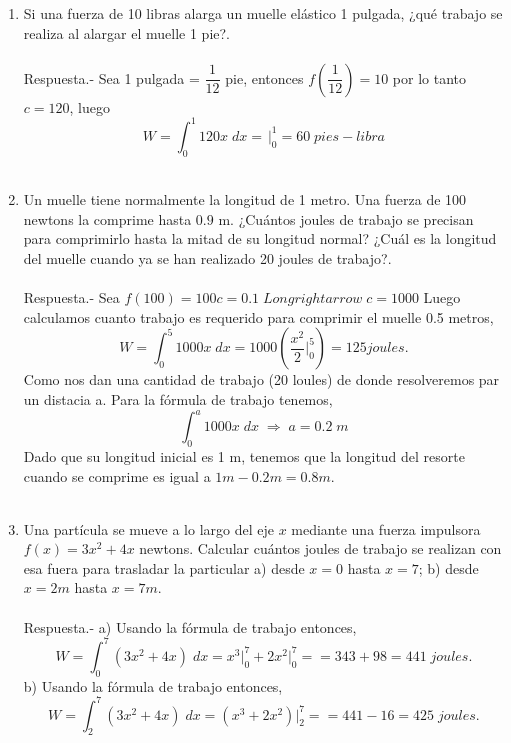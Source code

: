 \begin{enumerate}[ \bfseries 1.]

    \item Si una fuerza de 10 libras alarga un muelle elástico 1 pulgada, ¿qué trabajo se realiza al alargar el muelle 1 pie?.\\\\
	Respuesta.-\; Sea 1 pulgada = $\dfrac{1}{12}$ pie, entonces $f\left(\dfrac{1}{12}\right) = 10$ por lo tanto $c=120$, luego 
	$$W=\int_0^1 120x\; dx = \dfrac{}{}\bigg|_0^1 = 60\; pies-libra$$\\

    \item Un muelle tiene normalmente la longitud de 1 metro. Una fuerza de 100 newtons la comprime hasta $0.9$ m. ¿Cuántos joules de trabajo se precisan para comprimirlo hasta la mitad de su longitud normal? ¿Cuál es la longitud del muelle cuando ya se han realizado 20 joules de trabajo?.\\\\
	Respuesta.-\; Sea $f(100) = 100c = 0.1\; Longrightarrow \; c=1000$
	Luego calculamos cuanto trabajo es requerido para comprimir el muelle 0.5 metros,
	$$W = \int_0^5 1000x\; dx = 1000\left(\dfrac{x^2}{2}\bigg|_0^5\right) = 125 joules.$$
	Como nos dan una cantidad de trabajo (20 loules) de donde resolveremos par un distacia a. Para la fórmula de trabajo tenemos,
	$$\int_0^a 1000x\; dx \; \Longrightarrow \; a=0.2\;m$$
	Dado que su longitud inicial es 1 m, tenemos que la longitud del resorte cuando se comprime es igual a $1m-0.2m = 0.8m$.\\\\

    \item Una partícula se mueve a lo largo del eje $x$ mediante una fuerza impulsora $f(x)=3x^2+4x$ newtons. Calcular cuántos joules de trabajo se realizan con esa fuera para trasladar la particular a) desde $x=0$ hasta $x=7$; b) desde $x=2m$ hasta $x=7m$.\\\\
	Respuesta.-\; a) Usando la fórmula de trabajo entonces,
	$$W=\int_0^7 (3x^2+4x)\; dx = x^3\bigg|_0^7 + 2x^2\bigg|_0^7 = = 343+98=441\; joules.$$
	b) Usando la fórmula de trabajo entonces,
	$$W=\int_2^7 (3x^2+4x)\; dx = (x^3 + 2x^2)\bigg|_2^7 = = 441 - 16 = 425\; joules.$$\\\\



\end{enumerate}
